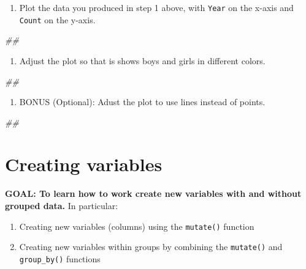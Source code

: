 \documentclass[]{book}
\newenvironment{Shaded}{\begin{snugshade}}{\end{snugshade}}
\newcommand{\CommentTok}[1]{\textcolor[rgb]{0.56,0.35,0.01}{\textit{#1}}}
\providecommand{\tightlist}{%
  \setlength{\itemsep}{0pt}\setlength{\parskip}{0pt}}
\begin{document}
\begin{enumerate}
\def\labelenumi{\arabic{enumi}.}
\setcounter{enumi}{1}
\tightlist
\item
  Plot the data you produced in step 1 above, with \texttt{Year} on the x-axis
  and \texttt{Count} on the y-axis.
\end{enumerate}

\begin{Shaded}
\begin{Highlighting}[]
\CommentTok{##}
\end{Highlighting}
\end{Shaded}

\begin{enumerate}
\def\labelenumi{\arabic{enumi}.}
\setcounter{enumi}{2}
\tightlist
\item
  Adjust the plot so that is shows boys and girls in different colors.
\end{enumerate}

\begin{Shaded}
\begin{Highlighting}[]
\CommentTok{##}
\end{Highlighting}
\end{Shaded}

\begin{enumerate}
\def\labelenumi{\arabic{enumi}.}
\setcounter{enumi}{3}
\tightlist
\item
  BONUS (Optional): Adust the plot to use lines instead of points.
\end{enumerate}

\begin{Shaded}
\begin{Highlighting}[]
\CommentTok{##}
\end{Highlighting}
\end{Shaded}

\hypertarget{creating-variables}{%
\section{Creating variables}\label{creating-variables}}

\textbf{GOAL: To learn how to work create new variables with and without grouped data.} In particular:

\begin{enumerate}
\def\labelenumi{\arabic{enumi}.}
\tightlist
\item
  Creating new variables (columns) using the \texttt{mutate()} function
\item
  Creating new variables within groups by combining the \texttt{mutate()} and \texttt{group\_by()} functions
\end{enumerate}
\end{document}
